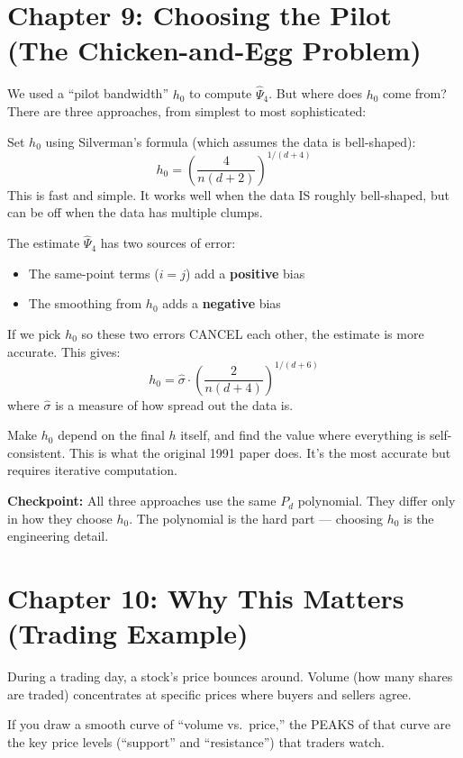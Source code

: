 \documentclass[12pt]{article}
\newcommand{\concept}[2]{\begin{tcolorbox}[colback=blue!3,colframe=blue!40!black,title={#1},breakable]#2\end{tcolorbox}}
\newcommand{\checkpoint}[1]{\begin{tcolorbox}[colback=purple!5,colframe=purple!50!black,breakable]\textbf{Checkpoint:} #1\end{tcolorbox}}
\begin{document}
\section{Chapter 9: Choosing the Pilot (The Chicken-and-Egg Problem)}

We used a ``pilot bandwidth'' $h_0$ to compute $\hat\Psi_4$. But where does $h_0$ come from? There are three approaches, from simplest to most sophisticated:

\concept{Approach 1: Use a simple rule (one-stage)}{
Set $h_0$ using Silverman's formula (which assumes the data is bell-shaped):
$$h_0 = \left(\frac{4}{n(d+2)}\right)^{1/(d+4)}$$
This is fast and simple. It works well when the data IS roughly bell-shaped, but can be off when the data has multiple clumps.
}

\concept{Approach 2: Use a better pilot from bias cancellation (two-stage)}{
The estimate $\hat\Psi_4$ has two sources of error:
\begin{itemize}
\item The same-point terms ($i = j$) add a \textbf{positive} bias
\item The smoothing from $h_0$ adds a \textbf{negative} bias
\end{itemize}
If we pick $h_0$ so these two errors CANCEL each other, the estimate is more accurate. This gives:
$$h_0 = \hat\sigma \cdot \left(\frac{2}{n(d+4)}\right)^{1/(d+6)}$$
where $\hat\sigma$ is a measure of how spread out the data is.
}

\concept{Approach 3: Solve a coupled equation (STE --- the full Sheather-Jones method)}{
Make $h_0$ depend on the final $h$ itself, and find the value where everything is self-consistent. This is what the original 1991 paper does. It's the most accurate but requires iterative computation.
}

\checkpoint{All three approaches use the same $P_d$ polynomial. They differ only in how they choose $h_0$. The polynomial is the hard part --- choosing $h_0$ is the engineering detail.}

\section{Chapter 10: Why This Matters (Trading Example)}

\concept{Finding price levels in stock markets}{
During a trading day, a stock's price bounces around. Volume (how many shares are traded) concentrates at specific prices where buyers and sellers agree.

If you draw a smooth curve of ``volume vs.\ price,'' the PEAKS of that curve are the key price levels (``support'' and ``resistance'') that traders watch.
}
\end{document}
